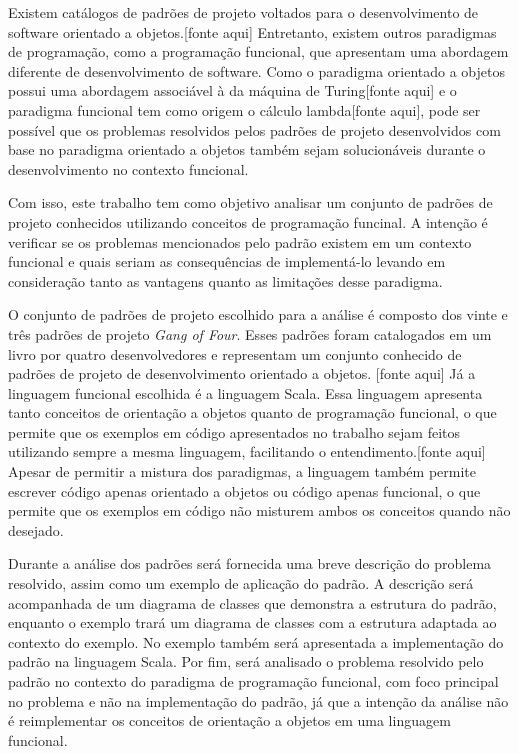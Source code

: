 
Existem catálogos de padrões de projeto 
voltados para o desenvolvimento de software 
orientado a objetos.[fonte aqui] Entretanto, existem 
outros paradigmas de programação, como 
a programação funcional, que apresentam 
uma abordagem diferente de desenvolvimento 
de software.
Como o paradigma orientado a objetos possui uma 
abordagem associável à da máquina de Turing[fonte aqui] e 
o paradigma funcional tem como origem o cálculo 
lambda[fonte aqui], pode ser possível que os problemas 
resolvidos pelos padrões de projeto desenvolvidos 
com base no paradigma orientado a objetos também 
sejam solucionáveis durante o desenvolvimento 
no contexto funcional. 


Com isso, este trabalho tem como objetivo 
analisar um conjunto de padrões de projeto 
conhecidos utilizando conceitos de programação 
funcinal. A intenção é verificar se os 
problemas mencionados pelo padrão existem 
em um contexto funcional e quais 
seriam as consequências de implementá-lo 
levando em consideração tanto as vantagens 
quanto as limitações desse paradigma.


O conjunto de padrões de projeto escolhido 
para a análise é composto dos vinte e três 
padrões de projeto \textit{Gang of Four}. 
Esses padrões foram catalogados em um livro 
por quatro desenvolvedores e representam 
um conjunto conhecido de padrões de projeto 
de desenvolvimento orientado a objetos. [fonte aqui]
Já a linguagem funcional escolhida é a 
linguagem Scala. Essa linguagem 
apresenta tanto conceitos de orientação 
a objetos quanto de programação funcional, 
o que permite que os exemplos em código 
apresentados no trabalho sejam feitos 
utilizando sempre a mesma linguagem, 
facilitando o entendimento.[fonte aqui]
Apesar de permitir a mistura dos 
paradigmas, a linguagem também permite  
escrever código apenas orientado a 
objetos ou código apenas funcional, 
o que permite que os exemplos em 
código não misturem ambos os conceitos 
quando não desejado.


Durante a análise dos padrões será 
fornecida uma breve descrição do problema 
resolvido, assim como um exemplo de aplicação 
do padrão. A descrição será acompanhada de 
um diagrama de classes que demonstra a 
estrutura do padrão, enquanto o exemplo 
trará um diagrama de classes com a estrutura 
adaptada ao contexto do exemplo. No exemplo 
também será apresentada a implementação 
do padrão na linguagem Scala. Por fim, será 
analisado o problema resolvido pelo padrão 
no contexto do paradigma de programação 
funcional, com foco principal no problema 
e não na implementação do padrão, já que 
a intenção da análise não é reimplementar os 
conceitos de orientação a objetos em uma 
linguagem funcional. 

